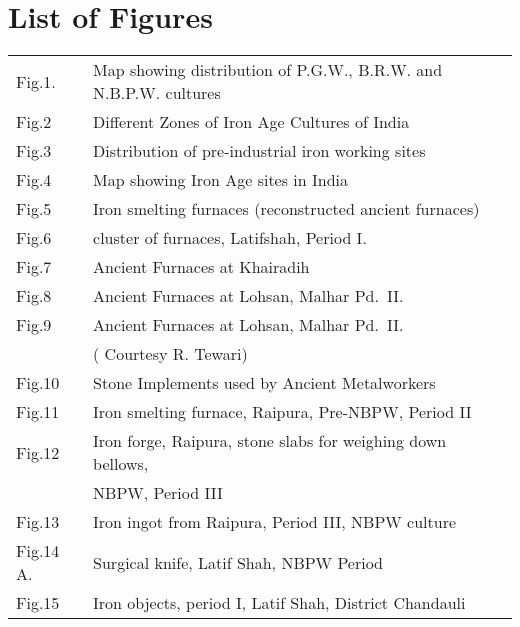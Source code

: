 \chapter*{List of Figures}\label{figures}


\vspace{-1cm}

{\fontsize{9}{11}\selectfont\begin{longtable}{@{}p{1.3cm}@{}p{8cm}@{}}
Fig.1. & Map showing distribution of P.G.W., B.R.W. and N.B.P.W. cultures\\[2pt]

Fig.2 & Different Zones of Iron Age Cultures of India \\[2pt]

Fig.3  & Distribution of pre-industrial iron working sites\\[2pt]

Fig.4  & Map showing Iron Age sites in India\\[2pt]

Fig.5  & Iron smelting furnaces (reconstructed ancient furnaces)\\[2pt]

Fig.6  & cluster of furnaces,  Latifshah, Period I.\\[2pt]

Fig.7  & Ancient Furnaces at Khairadih \\[2pt] 

Fig.8  & Ancient Furnaces at Lohsan, Malhar Pd.~II.\\[2pt]

Fig.9  & Ancient Furnaces at Lohsan, Malhar Pd.~II.\\[2pt]
       &( Courtesy R. Tewari)\\[2pt]

Fig.10  & Stone Implements used by Ancient Metalworkers\\[2pt]

Fig.11  & Iron smelting furnace, Raipura, Pre-NBPW, Period II\\[2pt]

Fig.12  & Iron forge, Raipura, stone slabs for weighing down bellows,\\[2pt]
        &  NBPW, Period III \\[2pt]
Fig.13  & Iron ingot from Raipura, Period III, NBPW culture \\[2pt]

Fig.14 A.  & Surgical knife, Latif Shah, NBPW Period\\[2pt]

Fig.15  & Iron  objects, period I, Latif Shah, District Chandauli \\[2pt]


\end{longtable}}
